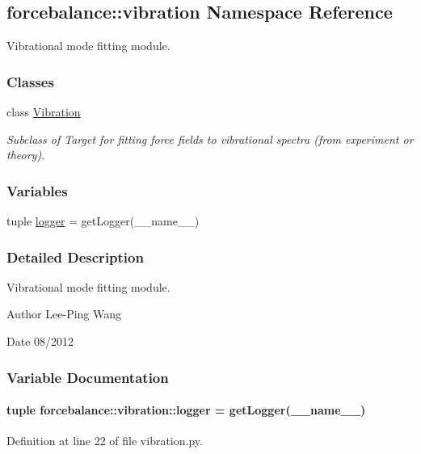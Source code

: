\hypertarget{namespaceforcebalance_1_1vibration}{\subsection{forcebalance\-:\-:vibration \-Namespace \-Reference}
\label{namespaceforcebalance_1_1vibration}
}


\-Vibrational mode fitting module.  


\subsubsection*{\-Classes}
\begin{DoxyCompactItemize}
\item 
class \hyperlink{classforcebalance_1_1vibration_1_1Vibration}{\-Vibration}
\begin{DoxyCompactList}\small\item\em \-Subclass of \-Target for fitting force fields to vibrational spectra (from experiment or theory). \end{DoxyCompactList}\end{DoxyCompactItemize}
\subsubsection*{\-Variables}
\begin{DoxyCompactItemize}
\item 
tuple \hyperlink{namespaceforcebalance_1_1vibration_a7c6f4643dac58f781e6ce94ec29a1635}{logger} = get\-Logger(\-\_\-\-\_\-name\-\_\-\-\_\-)
\end{DoxyCompactItemize}


\subsubsection{\-Detailed \-Description}
\-Vibrational mode fitting module. \begin{DoxyAuthor}{\-Author}
\-Lee-\/\-Ping \-Wang 
\end{DoxyAuthor}
\begin{DoxyDate}{\-Date}
08/2012 
\end{DoxyDate}


\subsubsection{\-Variable \-Documentation}
\hypertarget{namespaceforcebalance_1_1vibration_a7c6f4643dac58f781e6ce94ec29a1635}{
\paragraph[{logger}]{\setlength{\rightskip}{0pt plus 5cm}tuple {\bf forcebalance\-::vibration\-::logger} = get\-Logger(\-\_\-\-\_\-name\-\_\-\-\_\-)}}\label{namespaceforcebalance_1_1vibration_a7c6f4643dac58f781e6ce94ec29a1635}


\-Definition at line 22 of file vibration.\-py.

